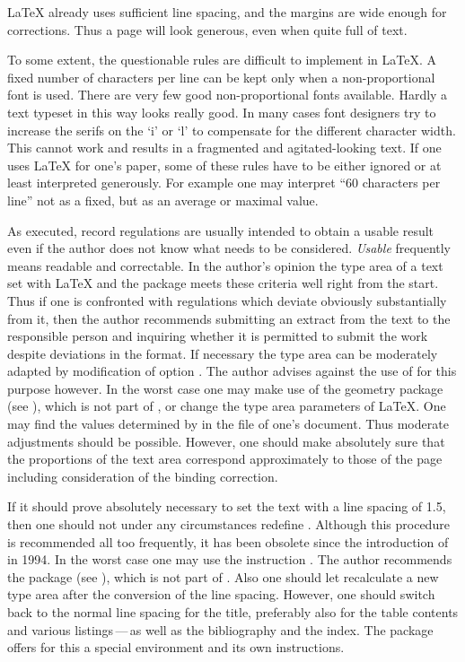 {\LaTeX} already uses sufficient line spacing, and the margins are
wide enough for corrections. Thus a page will look generous, even when
quite full of text.

To some extent, the questionable rules are difficult to implement in
{\LaTeX}. A fixed number of characters per line can be kept only when
a non-proportional font is used. There are very few good
non-proportional fonts available. Hardly a text typeset in this way
looks really good. In many cases font designers try to increase the
serifs on the `i' or `l' to compensate for the different character
width. This cannot work and results in a fragmented and
agitated-looking text. If one uses {\LaTeX} for one's paper, some of
these rules have to be either ignored or at least interpreted
generously. For example one may interpret ``60 characters per line''
not as a fixed, but as an average or maximal value.%

As executed, record regulations are usually intended to obtain a
usable result even if the author does not know what needs to be
considered. \emph{Usable} frequently means readable and correctable.  In
the author's opinion the type area of a text set with {\LaTeX} and the
 package meets these criteria well right from the
start.  Thus if one is confronted with regulations which deviate
obviously substantially from it, then the author recommends submitting
an extract from the text to the responsible person and inquiring
whether it is permitted to submit the work despite deviations in the
format.  If necessary the type area can be moderately adapted by
modification of option .  The author advises against the
use of  for this purpose however.  In the worst case
one may make use of the geometry package (see
\cite{package:geometry}), which is not part of \KOMAScript, or change
the type area parameters of \LaTeX.  One may find the values
determined by  in the  file of one's
document.  Thus moderate adjustments should be possible.  However, one
should make absolutely sure that the proportions of the text area
correspond approximately to those of the page including consideration
of the binding correction.

If it should prove absolutely necessary to set the text with a line
spacing of 1.5, then one should not under any circumstances redefine
.  Although this procedure is recommended all
too frequently, it has been obsolete since the introduction of
{\LaTeXe} in 1994.  In the worst case one may use the instruction
.  The author recommends the package
 (see
\cite{package:setspace}), which is not part of \KOMAScript.  Also one
should let  recalculate a new type area after the
conversion of the line spacing.  However, one should switch back to
the normal line spacing for the title, preferably also for the table
contents and various listings\,---\,as well as the bibliography and
the index.  The  package offers for this a special
environment and its own instructions.

